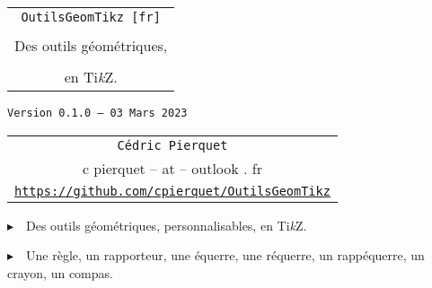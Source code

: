 \documentclass[french,a4paper,11pt]{article}
\def\TPversion{0.1.0}
\def\TPdate{03 Mars 2023}
\begin{document}
\setlength{\aweboxleftmargin}{0.07\linewidth}
\setlength{\aweboxcontentwidth}{0.93\linewidth}
\setlength{\aweboxvskip}{8pt}

\thispagestyle{empty}

\vspace{2cm}

\begin{center}
	\begin{minipage}{0.75\linewidth}
	\begin{tcolorbox}[colframe=yellow,colback=yellow!15]
		\begin{center}
			\begin{tabular}{c}
				{\Huge \texttt{OutilsGeomTikz [fr]}}\\
				\\
				{\LARGE Des outils géométriques, } \\
				\\
				{\LARGE en Ti\textit{k}Z}. \\
			\end{tabular}
			
			\bigskip
			
			{\small \texttt{Version \TPversion{} -- \TPdate}}
		\end{center}
	\end{tcolorbox}
\end{minipage}
\end{center}

\begin{center}
	\begin{tabular}{c}
	\texttt{Cédric Pierquet}\\
	{\ttfamily c pierquet -- at -- outlook . fr}\\
	\texttt{\url{https://github.com/cpierquet/OutilsGeomTikz}}
\end{tabular}
\end{center}

\vspace{0.25cm}

{$\blacktriangleright$~~Des outils géométriques, personnalisables, en Ti\textit{k}Z.}

\smallskip

{$\blacktriangleright$~~Une règle, un rapporteur, une équerre, une réquerre, un rappéquerre, un crayon, un compas.}

\vspace{0.5cm}
\end{document}
